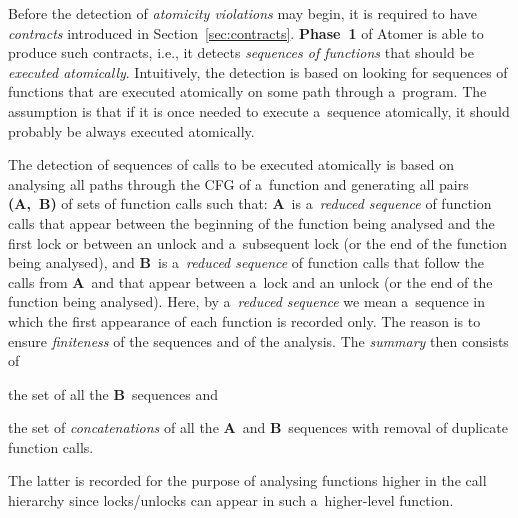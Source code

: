 \documentclass{ExcelAtFIT}
\begin{document}
Before the detection of \emph{atomicity
violations} may begin, it is required to have
\emph{contracts} introduced in
Section~\ref{sec:contracts}. \textbf{Phase~1}
of Atomer is able to produce such contracts,
i.e., it detects \emph{sequences of functions}
that should be \emph{executed atomically}.
Intuitively, the detection is based on
looking for sequences of functions that are
executed atomically on some path through
a~program. The assumption is that if it is
once needed to execute a~sequence atomically,
it should probably be always executed atomically.

The detection of sequences of calls to be
executed atomically is based on analysing all
paths through the CFG of
a~function and generating all pairs
\textbf{(A,~B)} of sets of function
calls such that: \textbf{A}~is a~\emph{reduced
sequence} of function calls that appear
between the beginning of the function being
analysed and the first lock or between an
unlock and a~subsequent lock (or the end of the
function being analysed), and
\textbf{B}~is a~\emph{reduced sequence} of function
calls that follow the calls from
\textbf{A}~and that appear between a~lock
and an unlock (or the end of the function
being analysed). Here, by a~\emph{reduced sequence}
we mean a~sequence in which the first
appearance of each function is recorded only.
The reason is to ensure \emph{finiteness} of the
sequences and of the analysis. The \emph{summary}
then consists of
\begin{enumerate*}[label={(\roman*)}]
    \item
        the set of all the \textbf{B}~sequences
        and

    \item
        the set of \emph{concatenations} of all
        the \textbf{A}~and \textbf{B}~sequences
        with removal of duplicate function calls.
\end{enumerate*}
The latter is recorded for the purpose of
analysing functions higher in the call
hierarchy since locks/unlocks can appear
in such a~higher-level function.
\end{document}
